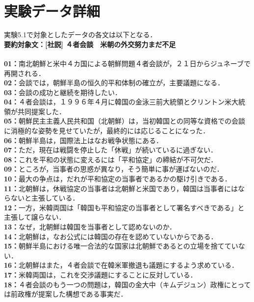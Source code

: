 \chapter{実験データ詳細}
\label{app_b}

実験5.1で対象としたデータの各文は以下となる．\\

\textbf{要約対象文：[社説] ４者会談　米朝の外交努力まだ不足}\\\\
\textbf{01：}南北朝鮮と米中４カ国による朝鮮問題４者会談が，２１日からジュネーブで再開される．\\
\textbf{02：}会談では，朝鮮半島の恒久的平和体制の確立が，主要議題になる．\\
\textbf{03：}会談の成功と継続を期待したい．\\
\textbf{04：}４者会談は，１９９６年４月に韓国の金泳三前大統領とクリントン米大統領が共同提案した．\\
\textbf{05：}朝鮮民主主義人民共和国（北朝鮮）は，当初韓国との同等な資格での会談に消極的な姿勢を見せていたが，最終的には応じることになった．\\
\textbf{06：}朝鮮半島は，国際法上はなお戦争状態にある．\\
\textbf{07：}ただ，現在は戦闘を停止した「休戦」が続いているに過ぎない．\\
\textbf{08：}これを平和の状態に変えるには「平和協定」の締結が不可欠だ．\\
\textbf{09：}ところが，当事者の思惑が異なり，そう簡単に事が運ばないのだ．\\
\textbf{10：}最大の争点は，だれが平和協定の当事者であるかの駆け引きである．\\
\textbf{11：}北朝鮮は，休戦協定の当事者は北朝鮮と米国であり，韓国は当事者にはならないと主張している．\\
\textbf{12：}一方，米韓両国は「韓国も平和協定の当事者として署名すべきである」と主張して譲らない．\\
\textbf{13：}なぜ，北朝鮮は韓国を当事者として認めないのか．\\
\textbf{14：}北朝鮮は，なお公式には韓国の存在を認めていないからである．\\
\textbf{15：}朝鮮半島における唯一合法的な国家は北朝鮮であるとの立場を捨てていない．\\
\textbf{16：}北朝鮮はまた，４者会談で在韓米軍撤退も議題にするよう求めている．\\
\textbf{17：}米韓両国は，これを交渉議題にすることに反対している．\\
\textbf{18：}４者会談のもう一つの問題は，韓国の金大中（キムデジュン）政権にとっては前政権が提案した構想である事実だ．\\

